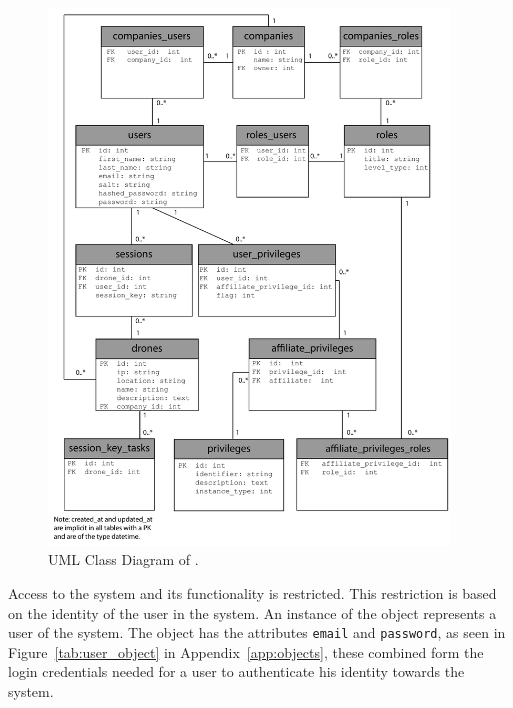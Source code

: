 \begin{figure}[htb]
    \centering
    \includegraphics[width=0.95\textwidth]{gfx/UML_model.pdf}
    \caption{UML Class Diagram of \projectname{}.}
    \label{fig:UML_class_diagram}
\end{figure}


Access to the system and its functionality is restricted.
This restriction is based on the identity of the user in the system.
An instance of the  object represents a user of the system.
The  object has the attributes \verb+email+ and \verb+password+, as seen in Figure~\ref{tab:user_object} in Appendix~\ref{app:objects}, these combined form the login credentials needed for a user to authenticate his identity towards the system. \\

